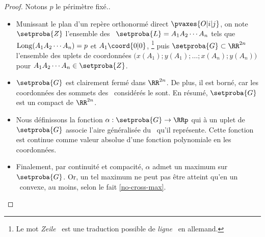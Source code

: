 \begin{proof}
	Notons $p$ le périmètre fixé..
    \begin{itemize}
        \item Munissant le plan d'un repère orthonormé direct $\pvaxes{O | i | j}$, on note $\setproba{Z}$ l'ensemble des \ncycles\ $\setproba{L} = A_1 A_2 \cdots A_n$ tels que
        $\mathrm{Long}(A_1 A_2 \cdots A_n) = p$
        et
        $A_1\coord{0 | 0}$,%
        \footnote{
        	Le mot \og \emph{Zeile} \fg\ est une traduction possible de \og \emph{ligne} \fg\ en allemand.
        }
        puis $\setproba{G} \subset \RR^{2n}$ l'ensemble des uplets de coordonnées $\big( x(A_1) ; y(A_1) ; \dots ; x(A_n) ; y(A_n) \big)$ pour $A_1 A_2 \cdots A_n \in \setproba{Z}$.


        \item $\setproba{G}$ est clairement fermé dans $\RR^{2n}$.
        De plus, il est borné, car les coordonnées des sommets des \ncycles\ considérés le sont.
        En résumé, $\setproba{G}$ est un compact de $\RR^{2n}$.


        \item Nous définissons la fonction $\alpha: \setproba{G} \rightarrow \RRp$ qui à un uplet de $\setproba{G}$ associe l'aire généralisée du \ncycle\ qu'il représente.
        Cette fonction est continue comme valeur absolue d'une fonction polynomiale en les coordonnées.


        \item Finalement, par continuité et compacité, $\alpha$ admet un maximum sur $\setproba{G}$.
        Or, un tel maximum ne peut pas être atteint qu'en un \ngone\ convexe, au moins, selon le fait \ref{no-cross-max}.
    \end{itemize}
\end{proof}
